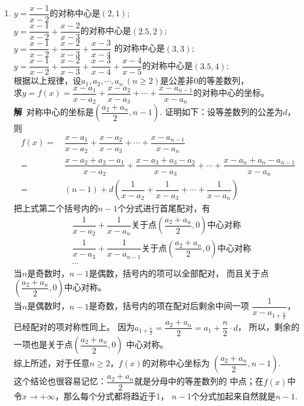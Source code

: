\begin{enumerate}[label={【\textbf{例\thechapter.\arabic*}】},
 leftmargin=\inteval{\myenumleftmargin}pt,
 itemsep=\inteval{\myenumitempsep}pt,
 itemindent=\inteval{\myenumitemindent}pt]
\item $ y=\dfrac{x-1}{x-2} $的对称中心是$(2,1)$; \\
$ y=\dfrac{x-1}{x-2}+\dfrac{x-2}{x-3} $的对称中心是$(2.5,2)$; \\
$ y=\dfrac{x-1}{x-2}+\dfrac{x-2}{x-3}+\dfrac{x-3}{x-4} $
的对称中心是$(3,3)$; \\
$ y=\dfrac{x-1}{x-2}+\dfrac{x-2}{x-3}+\dfrac{x-3}{x-4}+
\dfrac{x-4}{x-5} $的对称中心是$(3.5, 4)$; \\
根据以上规律，设$ a_1,a_2,\cdots,a_n \ (n\geq 2) $是公差非0的等差数列，\\
求$ y=f(x)=\dfrac{x-a_1}{x-a_2}+\dfrac{x-a_2}{x-a_3}+\cdots+
\dfrac{x-a_{n-1}}{x-a_n} $的对称中心的坐标。 \\
\textbf{解}\ 对称中心的坐标是$ \left(\dfrac{a_2+a_n}{2}, 
n-1\right) $. 证明如下：设等差数列的公差为$d$，则
\begin{align*}
    f(x)=&\ \dfrac{x-a_1}{x-a_2}+\dfrac{x-a_2}{x-a_3}+\cdots+
    \dfrac{x-a_{n-1}}{x-a_n} \\
    =&\ \dfrac{x-a_2+a_2-a_1}{x-a_2}+
    \dfrac{x-a_3+a_3-a_2}{x-a_3}+\cdots+
    \dfrac{x-a_n+a_n-a_{n-1}}{x-a_n}  \\
    =&\ (n-1)+d\left(\dfrac{1}{x-a_2}+
    \dfrac{1}{x-a_3}+\cdots+\dfrac{1}{x-a_n}\right) 
\end{align*}
把上式第二个括号内的$n-1$个分式进行首尾配对，有
\begin{align*}
    &\dfrac{1}{x-a_2}+\dfrac{1}{x-a_n}
    \text{关于点} \left(\dfrac{a_2+a_n}{2},0\right)\text{中心对称} \\
    &\dfrac{1}{x-a_3}+\dfrac{1}{x-a_{n-1}} 
    \text{关于点} \left(\dfrac{a_2+a_n}{2},0\right)\text{中心对称} \\
    & \cdots
\end{align*}
当$n$是奇数时，$n-1$是偶数，括号内的项可以全部配对，
而且关于点$\left(\dfrac{a_2+a_n}{2},0\right)$中心对称。 \\
当$n$是偶数时，$n-1$是奇数，括号内的项在配对后剩余中间一项
$\dfrac{1}{x-a_{1+\frac{n}{2}}}$，已经配对的项对称性同上。
因为$ a_{1+\frac{n}{2}}=\dfrac{a_2+a_n}{2}=a_1+
\dfrac{n}{2}\cdot d $，
所以，剩余的一项也是关于点$\left(\dfrac{a_2+a_n}{2},0\right)$
中心对称。\\
综上所述，对于任意$n\geq 2$，$f(x)$的对称中心坐标为
$ \left(\dfrac{a_2+a_n}{2}, n-1\right) $. \\
这个结论也很容易记忆：$\dfrac{a_2+a_n}{2}$就是分母中的等差数列的
中点；在$f(x)$中令$x\to+\infty$，那么每个分式都将趋近于1，
$n-1$个分式加起来自然就是$n-1$. 


\end{enumerate}
